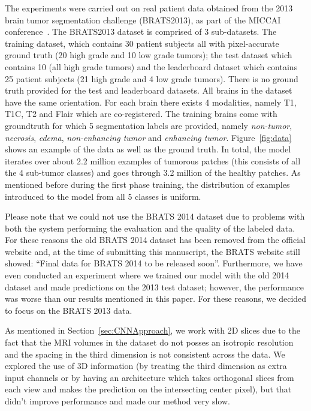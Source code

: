 \documentclass[final,5p,times,twocolumn]{elsarticle}
\begin{document}
The experiments were carried out on real patient data obtained from the 2013 brain tumor segmentation challenge (BRATS2013), as part of the MICCAI conference~\citep{braintumorsegmentationdotorg}. The BRATS2013 dataset is comprised of 3 sub-datasets. The training dataset, which contains 30 patient subjects all with pixel-accurate ground truth (20 high grade and 10 low grade tumors); the test dataset which contains 10 (all high grade tumors) and the leaderboard dataset which contains 25 patient subjects (21 high grade and 4 low grade tumors). There is no ground truth provided for the test and leaderboard datasets. All brains in the dataset have the same orientation. For each brain there exists 4 modalities, namely T1, T1C, T2 and Flair which are co-registered. The training brains come with groundtruth for which 5 segmentation labels are provided, namely {\it non-tumor}, {\it  necrosis}, {\it edema}, {\it non-enhancing tumor} and {\it enhancing tumor}. Figure~\ref{fig:data} shows an example of the data as well as the ground truth. In total, the model iterates over about 2.2 million examples of tumorous patches (this consists of all the 4 sub-tumor classes) and goes through 3.2 million of the healthy patches. As mentioned before during the first phase training, the distribution of examples introduced to the model from all 5 classes is uniform.

Please note that we could not use the BRATS 2014 dataset due to problems with both the system performing the evaluation and the quality of the labeled data. For these reasons the old BRATS 2014 dataset has been removed from the official website and, at the time of submitting this manuscript, the BRATS website still showed: ``Final data for BRATS 2014 to be released soon''. Furthermore, we have even conducted an experiment where we trained our model with the old 2014 dataset and made predictions on the 2013 test dataset; however, the performance was worse than our results mentioned in this paper. For these reasons, we decided to focus on the BRATS 2013 data.

As mentioned in Section~\ref{sec:CNNApproach}, we work with 2D slices due to the fact that the MRI volumes in the dataset do not posses an isotropic resolution and the spacing in the third dimension is not consistent across the data. We explored the use of 3D information (by treating the third dimension as extra input channels or by having an architecture which takes orthogonal slices from each view and makes the prediction on the intersecting center pixel), but that didn't improve performance and made our method very slow.
\end{document}
